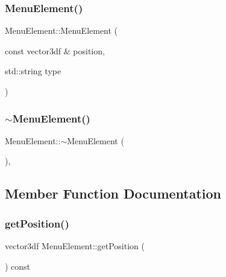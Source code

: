 \subsubsection{\texorpdfstring{MenuElement()}{MenuElement()}}
{\footnotesize\ttfamily Menu\+Element\+::\+Menu\+Element (\begin{DoxyParamCaption}\item[{const vector3df \&}]{position,  }\item[{std\+::string}]{type }\end{DoxyParamCaption})}

\mbox{\label{class_menu_element_a3c21f82d271e0435d3103d7847142f5c}} 
\subsubsection{\texorpdfstring{$\sim$MenuElement()}{~MenuElement()}}
{\footnotesize\ttfamily Menu\+Element\+::$\sim$\+Menu\+Element (\begin{DoxyParamCaption}{ }\end{DoxyParamCaption})\hspace{0.3cm}{\ttfamily [virtual]}, {\ttfamily [default]}}



\subsection{Member Function Documentation}
\mbox{\label{class_menu_element_adc73fb1d0615667eaf3f5328f577996d}} 
\subsubsection{\texorpdfstring{getPosition()}{getPosition()}}
{\footnotesize\ttfamily vector3df Menu\+Element\+::get\+Position (\begin{DoxyParamCaption}{ }\end{DoxyParamCaption}) const}

\mbox{\label{class_menu_element_ad0702505a011be10b7916650994d8d4e}} 

